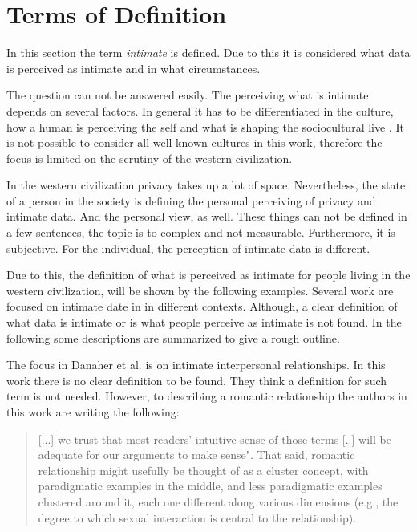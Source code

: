 \section{Terms of Definition}
\label{sec:terms_of_definition}
In this section the term \textit{intimate} is defined. Due to this it is considered what data is perceived as intimate and in what circumstances.

The question can not be answered easily. The perceiving what is intimate depends on several factors.
In general it has to be differentiated in the culture, how a human is perceiving the self and what is shaping the sociocultural live \cite{carrithers1985category}. It is not possible to consider all well-known cultures in this work, therefore the focus is limited on the scrutiny of the western civilization. 

In the western civilization privacy takes up a lot of space. Nevertheless, the state of a person in the society is defining the personal perceiving of privacy and intimate data. And the personal view, as well.
These things can not be defined in a few sentences, the topic is to complex and not measurable. Furthermore, it is subjective. For the individual, the perception of intimate data is different.

Due to this, the definition of what is perceived as intimate for people living in the western civilization, will be shown by the following examples. Several work are focused on intimate date in in different contexts. Although, a clear definition of what data is intimate or is what people perceive as intimate is not found.
In the following some descriptions are summarized to give a rough outline.

The focus in Danaher et al. \cite{doi:10.1080/15265161.2017.1409823} is on intimate interpersonal relationships. In this work there is no clear definition to be found. They think a definition for such term is not needed. However, to describing a romantic relationship the authors in this work are writing the following:

\begin{quote}
	[...] we trust that most readers' intuitive sense of those terms [..] will be adequate for our arguments to make sense". 
	That said, romantic relationship might usefully be thought of as a cluster concept, with paradigmatic examples in the middle, and less paradigmatic examples clustered around it, each one different along various dimensions (e.g., the degree to which sexual interaction is central to the relationship).
\end{quote}

